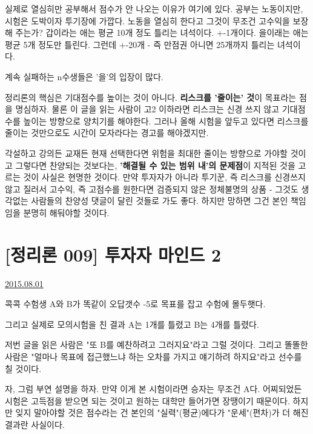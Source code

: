 실제로 열심히만 공부해서 점수가 안 나오는 이유가 여기에 있다.
공부는 노동이지만, 시험은 도박이자 투기장에 가깝다.
노동을 열심히 한다고 그것이 무조건 고수익을 보장해 주는가?
갑이라는 애는 평균 10개 정도 틀리는 녀석이다. +-1개이다.
을이래는 애는 평균 5개 정도만 틀린다. 그런데 +-20개 - 즉 만점권 아니면 25개까지 틀리는 녀석이다.
\vspace{5mm}

계속 실패하는 n수생들은 '을'의 입장이 많다.
\vspace{5mm}

정리론의 핵심은 기대점수를 높이는 것이 아니다. \textbf{리스크를 '줄이는' 것}이 목표라는 점을 명심하자.
물론 이 글을 읽는 사람이 고2 이하라면 리스크는 신경 쓰지 않고 기대점수를 높이는 방향으로 양치기를 해야한다.
그러나 올해 시험을 앞두고 있다면 리스크를 줄이는 것만으로도 시간이 모자라다는 경고를 해야겠지만.
\vspace{5mm}

각설하고 강의든 교재든 현재 선택한다면 위험을 최대한 줄이는 방향으로 가야할 것이고
그렇다면 찬양되는 것보다는, \textbf{'해결될 수 있는 범위 내'의 문제점}이 지적된 것을 고르는 것이 사실은 현명한 것이다.
만약 투자자가 아니라 투기꾼, 즉 리스크를 신경쓰지 않고 질러서 고수익, 즉 고점수를 원한다면
검증되지 않은 정체불명의 상품 - 그것도 생각없는 사람들의 찬양성 댓글이 달린 것들로 가도 좋다.
하지만 망하면 그건 본인 책임임을 분명히 해둬야할 것이다.
\vspace{5mm}






\section{[정리론 009] 투자자 마인드 2}
\href{https://www.kockoc.com/Apoc/226264}{2015.08.01}

\vspace{5mm}

콕콕 수험생 A와 B가 똑같이 오답갯수 -5로 목표를 잡고 수험에 몰두햇다.
\vspace{5mm}

그리고 실제로 모의시험을 친 결과
A는 1개를 틀렸고 B는 4개를 틀렸다.
\vspace{5mm}

저번 글을 읽은 사람은 "또 B를 예찬하려고 그러지요"라고 그럴 것이다.
그리고 똘똘한 사람은 "얼마나 목표에 접근했느냐 하는 오차를 가지고 얘기하려 하지요"라고 선수를 칠 것이다.
\vspace{5mm}

자, 그럼 부연 설명을 하자. 만약 이게 본 시험이라면 승자는 무조건 A다.
어찌되었든 시험은 고득점을 받으면 되는 것이고 원하는 대학만 들어가면 장땡이기 때문이다.
하지만 잊지 말아야할 것은 점수라는 건 본인의 "실력"(평균)에다가 "운세"(편차)가 더 해진 결과란 사실이다.
\vspace{5mm}

